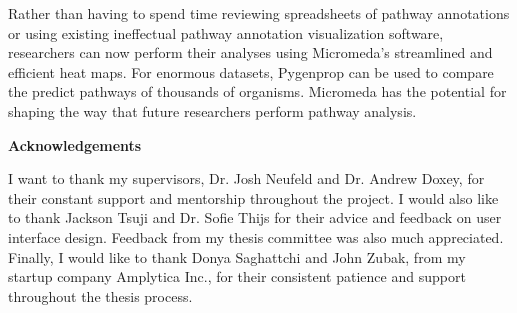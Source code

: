 Rather than having to spend time reviewing spreadsheets of pathway annotations or using existing ineffectual pathway annotation visualization software, researchers can now perform their analyses using Micromeda's streamlined and efficient heat maps. For enormous datasets, Pygenprop can be used to compare the predict pathways of thousands of organisms. Micromeda has the potential for shaping the way that future researchers perform pathway analysis.

\cleardoublepage


\begin{center}\textbf{Acknowledgements}\end{center}

I want to thank my supervisors, Dr. Josh Neufeld and Dr. Andrew Doxey, for their constant support and mentorship throughout the project. I would also like to thank Jackson Tsuji and Dr. Sofie Thijs for their advice and feedback on user interface design. Feedback from my thesis committee was also much appreciated. Finally, I would like to thank Donya Saghattchi and John Zubak, from my startup company Amplytica Inc., for their consistent patience and support throughout the thesis process.
\cleardoublepage

\renewcommand\contentsname{Table of Contents}
\tableofcontents
\cleardoublepage
{}    %

\listoftables
\cleardoublepage
{}		%

\listoffigures
\cleardoublepage
{}		%

\printglossaries
\cleardoublepage
{}		%


